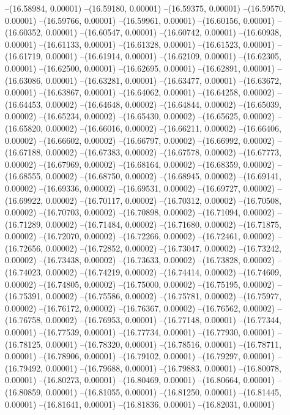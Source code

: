 --(16.58984, 0.00001)
--(16.59180, 0.00001)
--(16.59375, 0.00001)
--(16.59570, 0.00001)
--(16.59766, 0.00001)
--(16.59961, 0.00001)
--(16.60156, 0.00001)
--(16.60352, 0.00001)
--(16.60547, 0.00001)
--(16.60742, 0.00001)
--(16.60938, 0.00001)
--(16.61133, 0.00001)
--(16.61328, 0.00001)
--(16.61523, 0.00001)
--(16.61719, 0.00001)
--(16.61914, 0.00001)
--(16.62109, 0.00001)
--(16.62305, 0.00001)
--(16.62500, 0.00001)
--(16.62695, 0.00001)
--(16.62891, 0.00001)
--(16.63086, 0.00001)
--(16.63281, 0.00001)
--(16.63477, 0.00001)
--(16.63672, 0.00001)
--(16.63867, 0.00001)
--(16.64062, 0.00001)
--(16.64258, 0.00002)
--(16.64453, 0.00002)
--(16.64648, 0.00002)
--(16.64844, 0.00002)
--(16.65039, 0.00002)
--(16.65234, 0.00002)
--(16.65430, 0.00002)
--(16.65625, 0.00002)
--(16.65820, 0.00002)
--(16.66016, 0.00002)
--(16.66211, 0.00002)
--(16.66406, 0.00002)
--(16.66602, 0.00002)
--(16.66797, 0.00002)
--(16.66992, 0.00002)
--(16.67188, 0.00002)
--(16.67383, 0.00002)
--(16.67578, 0.00002)
--(16.67773, 0.00002)
--(16.67969, 0.00002)
--(16.68164, 0.00002)
--(16.68359, 0.00002)
--(16.68555, 0.00002)
--(16.68750, 0.00002)
--(16.68945, 0.00002)
--(16.69141, 0.00002)
--(16.69336, 0.00002)
--(16.69531, 0.00002)
--(16.69727, 0.00002)
--(16.69922, 0.00002)
--(16.70117, 0.00002)
--(16.70312, 0.00002)
--(16.70508, 0.00002)
--(16.70703, 0.00002)
--(16.70898, 0.00002)
--(16.71094, 0.00002)
--(16.71289, 0.00002)
--(16.71484, 0.00002)
--(16.71680, 0.00002)
--(16.71875, 0.00002)
--(16.72070, 0.00002)
--(16.72266, 0.00002)
--(16.72461, 0.00002)
--(16.72656, 0.00002)
--(16.72852, 0.00002)
--(16.73047, 0.00002)
--(16.73242, 0.00002)
--(16.73438, 0.00002)
--(16.73633, 0.00002)
--(16.73828, 0.00002)
--(16.74023, 0.00002)
--(16.74219, 0.00002)
--(16.74414, 0.00002)
--(16.74609, 0.00002)
--(16.74805, 0.00002)
--(16.75000, 0.00002)
--(16.75195, 0.00002)
--(16.75391, 0.00002)
--(16.75586, 0.00002)
--(16.75781, 0.00002)
--(16.75977, 0.00002)
--(16.76172, 0.00002)
--(16.76367, 0.00002)
--(16.76562, 0.00002)
--(16.76758, 0.00002)
--(16.76953, 0.00001)
--(16.77148, 0.00001)
--(16.77344, 0.00001)
--(16.77539, 0.00001)
--(16.77734, 0.00001)
--(16.77930, 0.00001)
--(16.78125, 0.00001)
--(16.78320, 0.00001)
--(16.78516, 0.00001)
--(16.78711, 0.00001)
--(16.78906, 0.00001)
--(16.79102, 0.00001)
--(16.79297, 0.00001)
--(16.79492, 0.00001)
--(16.79688, 0.00001)
--(16.79883, 0.00001)
--(16.80078, 0.00001)
--(16.80273, 0.00001)
--(16.80469, 0.00001)
--(16.80664, 0.00001)
--(16.80859, 0.00001)
--(16.81055, 0.00001)
--(16.81250, 0.00001)
--(16.81445, 0.00001)
--(16.81641, 0.00001)
--(16.81836, 0.00001)
--(16.82031, 0.00001)
